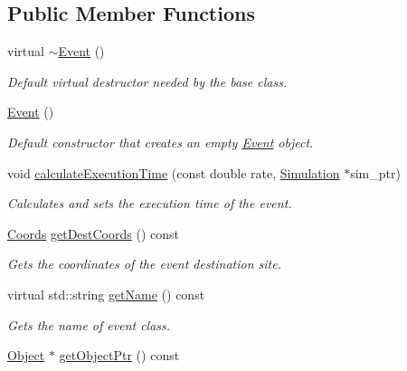 \subsection*{Public Member Functions}
\begin{DoxyCompactItemize}
\item 
\mbox{\label{class_event_a7704ec01ce91e673885792054214b3d2}} 
virtual \hyperlink{class_event_a7704ec01ce91e673885792054214b3d2}{$\sim$\+Event} ()
\begin{DoxyCompactList}\small\item\em Default virtual destructor needed by the base class. \end{DoxyCompactList}\item 
\mbox{\label{class_event_a5a40dd4708297f7031e29b39e039ae10}} 
\hyperlink{class_event_a5a40dd4708297f7031e29b39e039ae10}{Event} ()
\begin{DoxyCompactList}\small\item\em Default constructor that creates an empty \hyperlink{class_event}{Event} object. \end{DoxyCompactList}\item 
void \hyperlink{class_event_a14b3f90f4b4d72ab1d0bf70f9b4cc907}{calculate\+Execution\+Time} (const double rate, \hyperlink{class_simulation}{Simulation} $\ast$sim\+\_\+ptr)
\begin{DoxyCompactList}\small\item\em Calculates and sets the execution time of the event. \end{DoxyCompactList}\item 
\hyperlink{struct_coords}{Coords} \hyperlink{class_event_a6b4287971afaca8211f91f361ef55997}{get\+Dest\+Coords} () const
\begin{DoxyCompactList}\small\item\em Gets the coordinates of the event destination site. \end{DoxyCompactList}\item 
virtual std\+::string \hyperlink{class_event_a8c38a406d844d05eac1ef007bad2487f}{get\+Name} () const
\begin{DoxyCompactList}\small\item\em Gets the name of event class. \end{DoxyCompactList}\item 
\hyperlink{class_object}{Object} $\ast$ \hyperlink{class_event_a5317d42bb07d0e75bec0c13bd9bf6de8}{get\+Object\+Ptr} () const

\end{DoxyCompactItemize}
